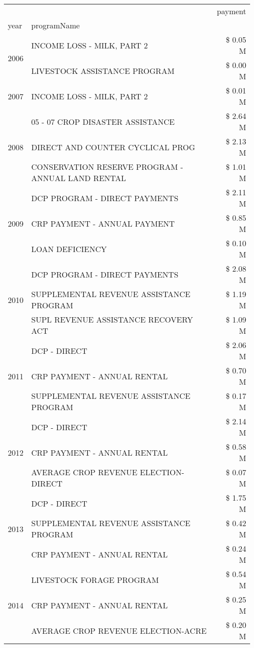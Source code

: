 \begin{tabular}{llr}
\toprule
 &  & payment \\
year & programName &  \\
\midrule
\multirow[t]{2}{*}{2006} & INCOME LOSS - MILK, PART 2 & \$ 0.05 M \\
 & LIVESTOCK ASSISTANCE PROGRAM & \$ 0.00 M \\
\cline{1-3}
2007 & INCOME LOSS - MILK, PART 2 & \$ 0.01 M \\
\cline{1-3}
\multirow[t]{3}{*}{2008} & 05 - 07 CROP DISASTER ASSISTANCE & \$ 2.64 M \\
 & DIRECT AND COUNTER CYCLICAL PROG & \$ 2.13 M \\
 & CONSERVATION RESERVE PROGRAM - ANNUAL LAND RENTAL & \$ 1.01 M \\
\cline{1-3}
\multirow[t]{3}{*}{2009} & DCP PROGRAM - DIRECT PAYMENTS & \$ 2.11 M \\
 & CRP PAYMENT - ANNUAL PAYMENT & \$ 0.85 M \\
 & LOAN DEFICIENCY & \$ 0.10 M \\
\cline{1-3}
\multirow[t]{3}{*}{2010} & DCP PROGRAM - DIRECT PAYMENTS & \$ 2.08 M \\
 & SUPPLEMENTAL REVENUE ASSISTANCE PROGRAM & \$ 1.19 M \\
 & SUPL REVENUE ASSISTANCE RECOVERY ACT & \$ 1.09 M \\
\cline{1-3}
\multirow[t]{3}{*}{2011} & DCP - DIRECT & \$ 2.06 M \\
 & CRP PAYMENT - ANNUAL RENTAL & \$ 0.70 M \\
 & SUPPLEMENTAL REVENUE ASSISTANCE PROGRAM & \$ 0.17 M \\
\cline{1-3}
\multirow[t]{3}{*}{2012} & DCP - DIRECT & \$ 2.14 M \\
 & CRP PAYMENT - ANNUAL RENTAL & \$ 0.58 M \\
 & AVERAGE CROP REVENUE ELECTION-DIRECT & \$ 0.07 M \\
\cline{1-3}
\multirow[t]{3}{*}{2013} & DCP - DIRECT & \$ 1.75 M \\
 & SUPPLEMENTAL REVENUE ASSISTANCE PROGRAM & \$ 0.42 M \\
 & CRP PAYMENT - ANNUAL RENTAL & \$ 0.24 M \\
\cline{1-3}
\multirow[t]{3}{*}{2014} & LIVESTOCK FORAGE PROGRAM & \$ 0.54 M \\
 & CRP PAYMENT - ANNUAL RENTAL & \$ 0.25 M \\
 & AVERAGE CROP REVENUE ELECTION-ACRE & \$ 0.20 M \\
\cline{1-3}

\end{tabular}
